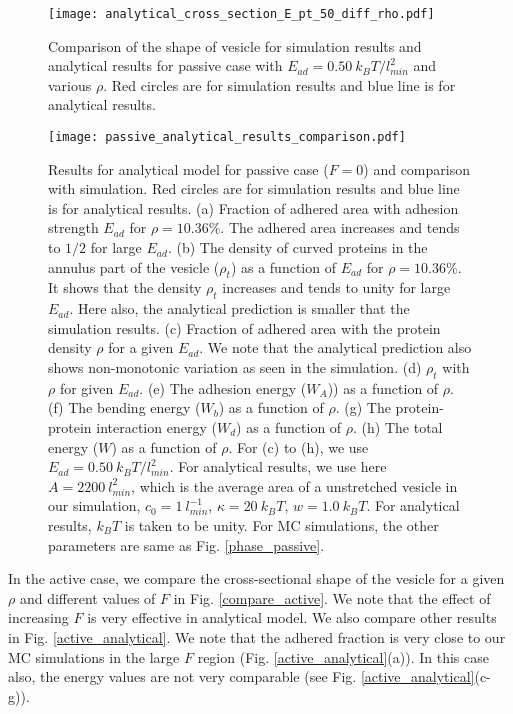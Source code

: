 \documentclass[pre,amsmath]{revtex4}
\begin{document}
\begin{figure}[ht]
\centering
\texttt{[image: analytical\_cross\_section\_E\_pt\_50\_diff\_rho.pdf]}
\caption{Comparison of the shape of vesicle for simulation results and analytical results for passive case with $E_{ad}=0.50~ k_B T/l_{min}^2$ and various $\rho$. Red circles are for simulation results and blue line is for analytical results.}
\label{compare_passive} 
\end{figure}

\begin{figure}[ht]
\centering
\texttt{[image: passive\_analytical\_results\_comparison.pdf]}
\caption{Results for analytical model for passive case ($F=0$) and comparison with simulation. Red circles are for simulation results and blue line is for analytical results. (a)  Fraction of adhered area with adhesion strength $E_{ad}$ for $\rho=10.36 \%$. The adhered area increases and tends to $1/2$ for large $E_{ad}$. (b) The density of curved proteins in the annulus part of the vesicle ($\rho_t$) as a function of $E_{ad}$ for $\rho=10.36 \%$. It shows that the density $\rho_t$ increases and tends to unity for large $E_{ad}$. Here also, the analytical prediction is smaller that the simulation results. (c) Fraction of adhered area with the protein density $\rho$ for a given $E_{ad}$. We note that the analytical prediction also shows non-monotonic variation as seen in the simulation.  (d) $\rho_t$ with $\rho$ for given $E_{ad}$. (e) The adhesion energy ($W_A$)) as a function of $\rho$. (f) The bending energy ($W_b$) as a function of $\rho$. (g) The protein-protein interaction energy ($W_d$) as a function of $\rho$. (h) The total energy ($W$) as a function of $\rho$. For (c) to (h), we use $E_{ad}=0.50 ~k_B T/l_{min}^2$. For analytical results, we use here $A=2200~l^2_{min}$, which is the average area of a unstretched  vesicle in our simulation, $c_0=1~l^{-1}_{min}$, $\kappa=20 ~k_B T$, $w=1.0~ k_B T$. For analytical results,  $k_B T$ is taken to be unity. For MC simulations, the other parameters are same as Fig. \ref{phase_passive}.}
\label{passive_analytical} 
\end{figure}

In the active case, we compare the cross-sectional shape of the vesicle for a given $\rho$ and different values of $F$ in Fig. \ref{compare_active}. We note that the effect of increasing $F$ is very effective in analytical model. We also compare other results in Fig. \ref{active_analytical}. We note that the adhered fraction is very close to our MC simulations in the large $F$ region (Fig. \ref{active_analytical}(a)). In this case also, the energy values are not very comparable (see Fig. \ref{active_analytical}(c-g)).
\end{document}
